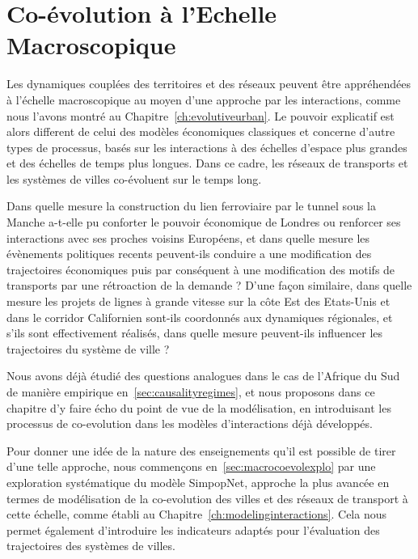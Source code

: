 
\chapter{Co-évolution à l'Echelle Macroscopique}


\label{ch:macrocoevolution} 



Les dynamiques couplées des territoires et des réseaux peuvent être appréhendées à l'échelle macroscopique au moyen d'une approche par les interactions, comme nous l'avons montré au Chapitre~\ref{ch:evolutiveurban}. Le pouvoir explicatif est alors different de celui des modèles économiques classiques et concerne d'autre types de processus, basés sur les interactions à des échelles d'espace plus grandes et des échelles de temps plus longues. Dans ce cadre, les réseaux de transports et les systèmes de villes co-évoluent sur le temps long.


Dans quelle mesure la construction du lien ferroviaire par le tunnel sous la Manche a-t-elle pu conforter le pouvoir économique de Londres ou renforcer ses interactions avec ses proches voisins Européens, et dans quelle mesure les évènements politiques recents peuvent-ils conduire a une modification des trajectoires économiques puis par conséquent à une modification des motifs de transports par une rétroaction de la demande ? D'une façon similaire, dans quelle mesure les projets de lignes à grande vitesse sur la côte Est des Etats-Unis et dans le corridor Californien sont-ils coordonnés aux dynamiques régionales, et s'ils sont effectivement réalisés, dans quelle mesure peuvent-ils influencer les trajectoires du système de ville ?


Nous avons déjà étudié des questions analogues dans le cas de l'Afrique du Sud de manière empirique en~\ref{sec:causalityregimes}, et nous proposons dans ce chapitre d'y faire écho du point de vue de la modélisation, en introduisant les processus de co-evolution dans les modèles d'interactions déjà développés.


Pour donner une idée de la nature des enseignements qu'il est possible de tirer d'une telle approche, nous commençons en~\ref{sec:macrocoevolexplo} par une exploration systématique du modèle SimpopNet, approche la plus avancée en termes de modélisation de la co-evolution des villes et des réseaux de transport à cette échelle, comme établi au Chapitre~\ref{ch:modelinginteractions}. Cela nous permet également d'introduire les indicateurs adaptés pour l'évaluation des trajectoires des systèmes de villes.


